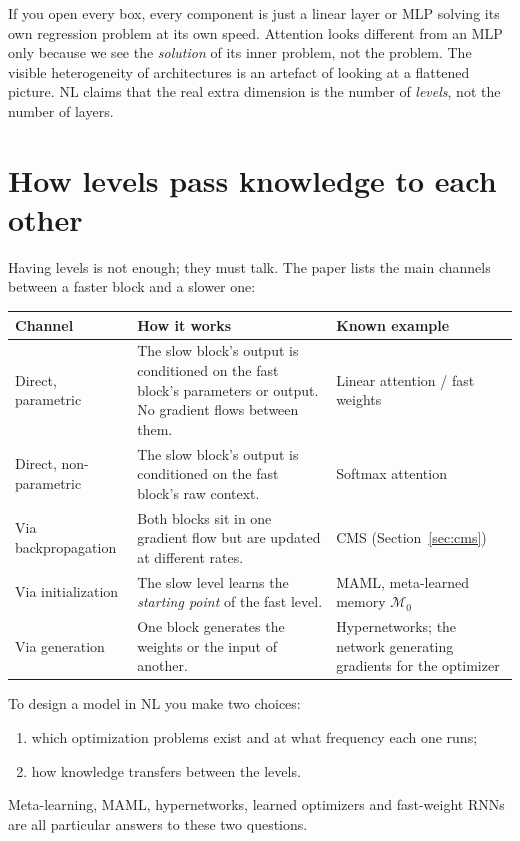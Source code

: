 \documentclass[11pt,a4paper]{article}
\newcommand{\M}{\mathcal{M}}
\begin{document}
\begin{keyidea}
If you open every box, every component is just a linear layer or MLP solving its own regression problem at its own speed. Attention looks different from an MLP only because we see the \emph{solution} of its inner problem, not the problem. The visible heterogeneity of architectures is an artefact of looking at a flattened picture. NL claims that the real extra dimension is the number of \emph{levels}, not the number of layers.
\end{keyidea}

\section{How levels pass knowledge to each other}

Having levels is not enough; they must talk. The paper lists the main channels between a faster block and a slower one:

\begin{center}
\begin{tabularx}{\textwidth}{@{}>{\raggedright}p{2.9cm}X>{\raggedright\arraybackslash}p{4.2cm}@{}}
\toprule
\textbf{Channel} & \textbf{How it works} & \textbf{Known example}\\
\midrule
Direct, parametric & The slow block's output is conditioned on the fast block's parameters or output. No gradient flows between them. & Linear attention / fast weights\\
Direct, non-parametric & The slow block's output is conditioned on the fast block's raw context. & Softmax attention\\
Via backpropagation & Both blocks sit in one gradient flow but are updated at different rates. & CMS (Section~\ref{sec:cms})\\
Via initialization & The slow level learns the \emph{starting point} of the fast level. & MAML, meta-learned memory $\M_0$\\
Via generation & One block generates the weights or the input of another. & Hypernetworks; the network generating gradients for the optimizer\\
\bottomrule
\end{tabularx}
\end{center}

\begin{keyidea}
To design a model in NL you make two choices:
\begin{enumerate}[leftmargin=1.4em]
  \item which optimization problems exist and at what frequency each one runs;
  \item how knowledge transfers between the levels.
\end{enumerate}
Meta-learning, MAML, hypernetworks, learned optimizers and fast-weight RNNs are all particular answers to these two questions.
\end{keyidea}
\end{document}
